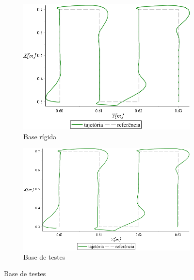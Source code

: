 \begin{figure}[h]
    \centering
    \begin{subfigure}[b]{0.48\textwidth}
        \includegraphics[width=\textwidth]{figs/t2_traj_base_rig}
        \caption{Base rígida}
        \label{fig::t2_traj_base_rig}
    \end{subfigure}
    \quad %
    \begin{subfigure}[b]{0.48\textwidth}
        \includegraphics[width=\textwidth]{figs/t2_traj_base_testes}
        \caption{Base de testes}
        \label{fig::t2_traj_base_testes}
    \end{subfigure}
    \quad %

\end{figure}
